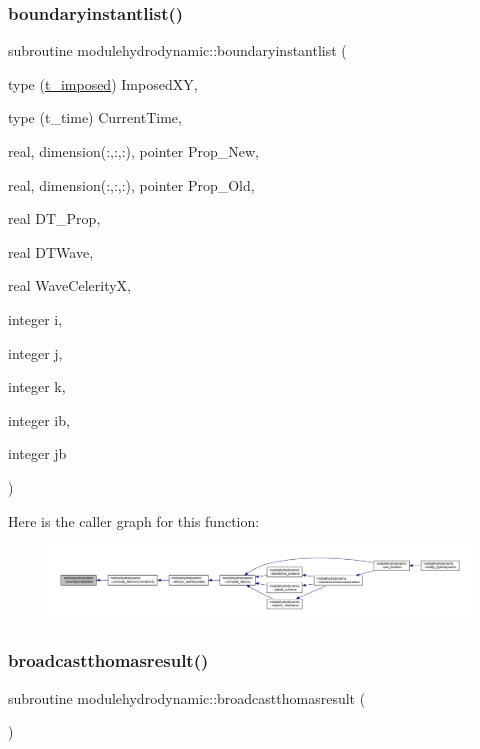 \subsubsection{\texorpdfstring{boundaryinstantlist()}{boundaryinstantlist()}}
{\footnotesize\ttfamily subroutine modulehydrodynamic\+::boundaryinstantlist (\begin{DoxyParamCaption}\item[{type (\mbox{\hyperlink{structmodulehydrodynamic_1_1t__imposed}{t\+\_\+imposed}})}]{Imposed\+XY,  }\item[{type (t\+\_\+time)}]{Current\+Time,  }\item[{real, dimension(\+:,\+:,\+:), pointer}]{Prop\+\_\+\+New,  }\item[{real, dimension(\+:,\+:,\+:), pointer}]{Prop\+\_\+\+Old,  }\item[{real}]{D\+T\+\_\+\+Prop,  }\item[{real}]{D\+T\+Wave,  }\item[{real}]{Wave\+CelerityX,  }\item[{integer}]{i,  }\item[{integer}]{j,  }\item[{integer}]{k,  }\item[{integer}]{ib,  }\item[{integer}]{jb }\end{DoxyParamCaption})\hspace{0.3cm}{\ttfamily [private]}}

Here is the caller graph for this function\+:\nopagebreak
\begin{figure}[H]
\begin{center}
\leavevmode
\includegraphics[width=350pt]{namespacemodulehydrodynamic_a1e87e450d8be8b7bee682d2ef22558f8_icgraph}
\end{center}
\end{figure}
\mbox{\label{namespacemodulehydrodynamic_a3dc68350b123c83700a52b23bdbf8151}} 
\subsubsection{\texorpdfstring{broadcastthomasresult()}{broadcastthomasresult()}}
{\footnotesize\ttfamily subroutine modulehydrodynamic\+::broadcastthomasresult (\begin{DoxyParamCaption}{ }\end{DoxyParamCaption})\hspace{0.3cm}{\ttfamily [private]}}


